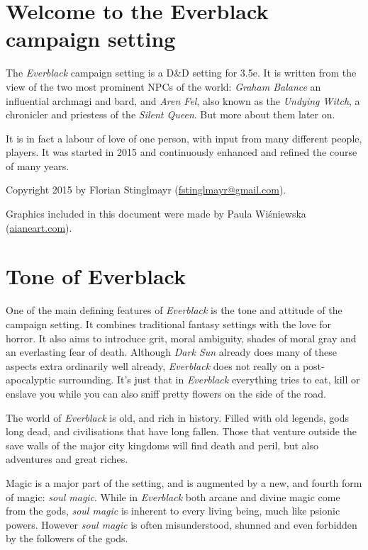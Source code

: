 \twocolumn
\section*{Welcome to the Everblack campaign setting}

The \emph{Everblack} campaign setting is a D\&D setting for 3.5e.  It is
written from the view of the two most prominent NPCs of the world:
\emph{Graham Balance} an influential archmagi and bard, and \emph{Aren Fel},
also known as the \emph{Undying Witch}, a chronicler and priestess of the
\emph{Silent Queen}. But more about them later on.

It is in fact a labour of love of one person, with input from many different
people, players. It was started in 2015 and continuously enhanced and refined
the course of many years.

Copyright 2015 by Florian Stinglmayr
(\href{mailto:fstinglmayr@gmail.com}{fstinglmayr@gmail.com}).

Graphics included in this document were made by Paula Wiśniewska
(\href{http://aianeart.com}{aianeart.com}).

\section*{Tone of Everblack}

One of the main defining features of \emph{Everblack} is the tone and attitude
of the campaign setting. It combines traditional fantasy settings with the love
for horror. It also aims to introduce grit, moral ambiguity, shades of moral
gray and an everlasting fear of death. Although \emph{Dark Sun} already does
many of these aspects extra ordinarily well already, \emph{Everblack} does not
really on a post-apocalyptic surrounding. It's just that in \emph{Everblack}
everything tries to eat, kill or enslave you while you can also sniff pretty
flowers on the side of the road.

The world of \emph{Everblack} is old, and rich in history. Filled with old
legends, gods long dead, and civilisations that have long fallen. Those that
venture outside the save walls of the major city kingdoms will find death and
peril, but also adventures and great riches.

Magic is a major part of the setting, and is augmented by a new, and fourth
form of magic: \emph{soul magic}. While in \emph{Everblack} both arcane and
divine magic come from the gods, \emph{soul magic} is inherent to every living
being, much like psionic powers. However \emph{soul magic} is often
misunderstood, shunned and even forbidden by the followers of the gods.

